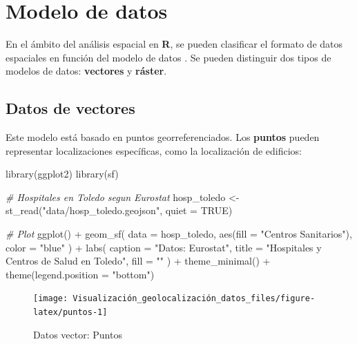 \documentclass[
]{book}
\newenvironment{Shaded}{\begin{snugshade}}{\end{snugshade}}
\newcommand{\AttributeTok}[1]{\textcolor[rgb]{0.77,0.63,0.00}{#1}}
\newcommand{\CommentTok}[1]{\textcolor[rgb]{0.56,0.35,0.01}{\textit{#1}}}
\newcommand{\ConstantTok}[1]{\textcolor[rgb]{0.00,0.00,0.00}{#1}}
\newcommand{\FunctionTok}[1]{\textcolor[rgb]{0.00,0.00,0.00}{#1}}
\newcommand{\NormalTok}[1]{#1}
\newcommand{\OtherTok}[1]{\textcolor[rgb]{0.56,0.35,0.01}{#1}}
\newcommand{\SpecialCharTok}[1]{\textcolor[rgb]{0.00,0.00,0.00}{#1}}
\newcommand{\StringTok}[1]{\textcolor[rgb]{0.31,0.60,0.02}{#1}}
\theoremstyle{definition}
\theoremstyle{definition}
\theoremstyle{definition}
\theoremstyle{definition}
\theoremstyle{remark}
\begin{document}
\hypertarget{modelo-de-datos}{%
\section{Modelo de datos}\label{modelo-de-datos}}

En el ámbito del análisis espacial en \textbf{R}, se pueden clasificar el formato de
datos espaciales en función del modelo de datos \citep{Lovelance_et_al_2019}. Se
pueden distinguir dos tipos de modelos de datos: \textbf{vectores} y \textbf{ráster}.

\hypertarget{vec}{%
\subsection{Datos de vectores}\label{vec}}

Este modelo está basado en puntos georreferenciados. Los \textbf{puntos} pueden
representar localizaciones específicas, como la localización de edificios:

\begin{Shaded}
\begin{Highlighting}[]

\FunctionTok{library}\NormalTok{(ggplot2)}
\FunctionTok{library}\NormalTok{(sf)}


\CommentTok{\# Hospitales en Toledo segun Eurostat}
\NormalTok{hosp\_toledo }\OtherTok{\textless{}{-}} \FunctionTok{st\_read}\NormalTok{(}\StringTok{"data/hosp\_toledo.geojson"}\NormalTok{, }\AttributeTok{quiet =} \ConstantTok{TRUE}\NormalTok{)}

\CommentTok{\# Plot}
\FunctionTok{ggplot}\NormalTok{() }\SpecialCharTok{+}
  \FunctionTok{geom\_sf}\NormalTok{(}
    \AttributeTok{data =}\NormalTok{ hosp\_toledo, }\FunctionTok{aes}\NormalTok{(}\AttributeTok{fill =} \StringTok{"Centros Sanitarios"}\NormalTok{),}
    \AttributeTok{color =} \StringTok{"blue"}
\NormalTok{  ) }\SpecialCharTok{+}
  \FunctionTok{labs}\NormalTok{(}
    \AttributeTok{caption =} \StringTok{"Datos: Eurostat"}\NormalTok{,}
    \AttributeTok{title =} \StringTok{"Hospitales y Centros de Salud en Toledo"}\NormalTok{,}
    \AttributeTok{fill =} \StringTok{""}
\NormalTok{  ) }\SpecialCharTok{+}
  \FunctionTok{theme\_minimal}\NormalTok{() }\SpecialCharTok{+}
  \FunctionTok{theme}\NormalTok{(}\AttributeTok{legend.position =} \StringTok{"bottom"}\NormalTok{)}
\end{Highlighting}
\end{Shaded}

\begin{figure}

{\centering \texttt{[image: Visualización\_geolocalización\_datos\_files/figure-latex/puntos-1]} 

}

\caption{Datos vector: Puntos}\label{fig:puntos}
\end{figure}
\end{document}
